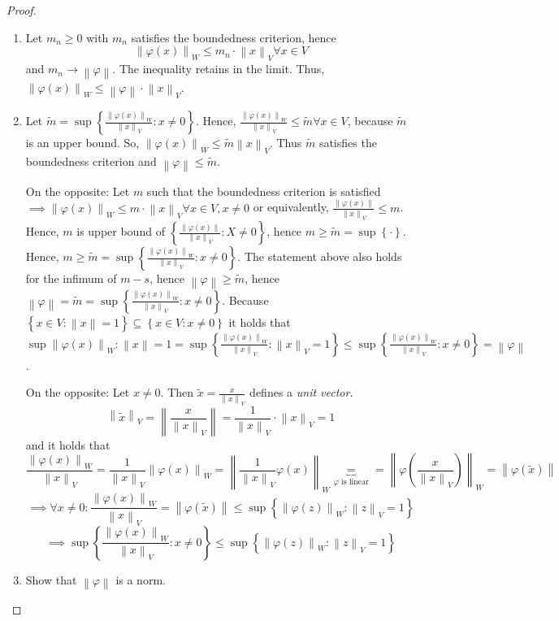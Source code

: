 \documentclass{article}
\newcommand{\set}[1]{\left\{#1\right\}}
\newcommand{\norm}[1]{\left\|#1\right\|}
\begin{document}
\begin{proof}
  \begin{enumerate}
    \item Let $m_n \geq 0$ with $m_n$ satisfies the boundedness criterion, hence
      \[ \norm{\varphi(x)}_W \leq m_n \cdot \norm{x}_V \forall x \in V \]
      and $m_n \to \norm{\varphi}$.
      The inequality retains in the limit. Thus, $\norm{\varphi(x)}_W \leq \norm{\varphi} \cdot \norm{x}_V$.
    \item Let $\tilde m = \sup\set{\frac{\norm{\varphi(x)}_W}{\norm{x}_V}: x \neq 0}$.
      Hence, $\frac{\norm{\varphi(x)}_W}{\norm{x}_V} \leq \tilde m \forall x \in V$, because $\tilde m$ is an upper bound.
      So, $\norm{\varphi(x)}_W \leq \tilde m \norm{x}_V$. Thus $\tilde m$ satisfies the boundedness criterion and $\norm{\varphi} \leq \tilde m$.

      On the opposite: Let $m$ such that the boundedness criterion is satisfied $\implies \norm{\varphi(x)}_W \leq m \cdot \norm{x}_V \forall x \in V, x \neq 0$
      or equivalently, $\frac{\norm{\varphi(x)}}{\norm{x}_V} \leq m$.
      Hence, $m$ is upper bound of $\set{\frac{\norm{\varphi(x)}}{\norm{x}_V} : X \neq 0}$, hence $m \geq \tilde m = \sup\set{\cdot}$.
      Hence, $m \geq \tilde m = \sup\set{\frac{\norm{\varphi(x)}_W}{\norm{x}_V}: x \neq 0}$.
      The statement above also holds for the infimum of $m-s$, hence $\norm{\varphi} \geq \tilde m$,
      hence $\norm{\varphi} = \tilde m = \sup\set{\frac{\norm{\varphi(x)}_W}{\norm{x}_V}: x \neq 0}$.
      Because $\set{x \in V: \norm{x} = 1} \subseteq \set{x \in V: x \neq 0}$ it holds that
      $\sup{\norm{\varphi(x)}_W: \norm{x} = 1} = \sup{\set{\frac{\norm{\varphi(x)}_W}{\norm{x}_V} : \norm{x}_V = 1}} \leq \sup\set{\frac{\norm{\varphi(x)}_W}{\norm{x}_V} : x \neq 0} = \norm{\varphi}$.

      On the opposite: Let $x \neq 0$. Then $\tilde x = \frac{x}{\norm{x}_V}$ defines a \emph{unit vector}.
      \[ \norm{\tilde x}_V = \norm{\frac{x}{\norm{x}_V}} = \frac{1}{\norm{x}_V} \cdot \norm{x}_V = 1 \]
      and it holds that
      \[ \frac{\norm{\varphi(x)}_W}{\norm{x}_V} = \frac{1}{\norm{x}_V} \norm{\varphi(x)}_W = \norm{\frac{1}{\norm{x}_V} \varphi(x)}_W \underbrace{=}_{\varphi \text{ is linear}} = \norm{\varphi(\frac{x}{\norm{x}_V})}_W = \norm{\varphi(\tilde x)} \]
      \[ \implies \forall x \neq 0: \frac{\norm{\varphi(x)}_W}{\norm{x}_V} = \norm{\varphi(\tilde x)} \leq \sup\set{\norm{\varphi(z)}_W: \norm{z}_V = 1} \]
      \[ \implies \sup\set{\frac{\norm{\varphi(x)}_W}{\norm{x}_V}: x \neq 0} \leq \sup\set{\norm{\varphi(z)}_W: \norm{z}_V = 1} \]
    \item Show that $\norm{\varphi}$ is a norm.


\end{enumerate}
\end{proof}
\end{document}
